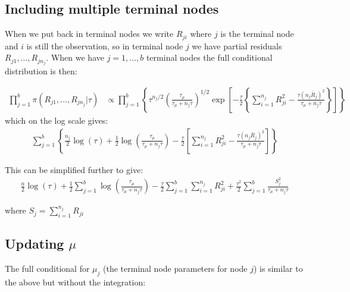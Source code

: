 \documentclass{article}
\begin{document}
\subsection*{Including multiple terminal nodes}

When we put back in terminal nodes we write $R_{ji}$ where $j$ is the terminal node and $i$ is still the observation, so in terminal node $j$ we have partial residuals $R_{j1}, \ldots, R_{jn_j}$. When we have $j=1,\ldots,b$ terminal nodes the full conditional distribution is then:

\begin{align*}
\prod_{j=1}^b \pi(R_{j1}, \ldots, R_{jn_j} | \tau) &\propto \prod_{j=1}^b \left\{ \tau^{n_j/2} \left( \frac{\tau_\mu}{\tau_\mu + n_j \tau} \right)^{1/2} \exp \left[ -\frac{\tau}{2} \left\{ \sum_{i=1}^{n_j} R_{ji}^2 - \frac{ \tau (n_j \bar{R}_j)^2 }{ \tau_\mu + n_j \tau } \right\} \right] \right\}
\end{align*}
which on the log scale gives:
\begin{align*}
\sum_{j=1}^b \left\{ \frac{n_j}{2} \log(\tau) + \frac{1}{2} \log \left( \frac{\tau_\mu}{\tau_\mu + n_j \tau} \right) - \frac{\tau}{2} \left[ \sum_{i=1}^{n_j} R_{ji}^2 - \frac{ \tau (n_j \bar{R}_j)^2 }{ \tau_\mu + n_j \tau } \right] \right\}
\end{align*}

This can be simplified further to give:
\begin{align}
\frac{n}{2} \log(\tau) + \frac{1}{2} \sum_{j=1}^b \log \left( \frac{\tau_\mu}{\tau_\mu + n_j \tau} \right) - \frac{\tau}{2} \sum_{j=1}^b 
\sum_{i=1}^{n_j} R_{ji}^2 + \frac{\tau^2}{2} \sum_{j=1}^b \frac{ S_j^2 }{ \tau_\mu + n_j \tau }
\end{align}

where $S_j = \sum_{i=1}^{n_j} R_{ji}$


\subsection*{Updating $\mu$}

The full conditional for $\mu_{j}$ (the terminal node parameters for node $j$) is similar to the above but without the integration:
\end{document}
